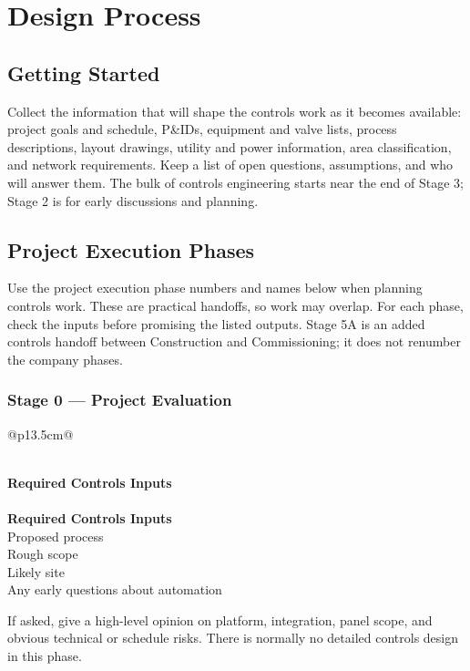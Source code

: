 \chapter{Design Process}
\section{Getting Started}
Collect the information that will shape the controls work as it becomes available: project goals and schedule, P\&IDs, equipment and valve lists, process descriptions, layout drawings, utility and power information, area classification, and network requirements. Keep a list of open questions, assumptions, and who will answer them. The bulk of controls engineering starts near the end of Stage 3; Stage 2 is for early discussions and planning.

\section{Project Execution Phases}
Use the project execution phase numbers and names below when planning controls work. These are practical handoffs, so work may overlap. For each phase, check the inputs before promising the listed outputs. Stage 5A is an added controls handoff between Construction and Commissioning; it does not renumber the company phases.

\subsection{Stage 0 --- Project Evaluation}

\begin{longtable}{@{}p{13.5cm}@{}}
\caption{Stage 0 --- Required Controls Inputs}\label{tab:stage0-inputs} \\
\toprule
{}\textbf{Required Controls Inputs} \\
\midrule
\endfirsthead
{} \\
\toprule
{}\textbf{Required Controls Inputs} \\
\midrule
\endhead
Proposed process \\
Rough scope \\
Likely site \\
Any early questions about automation \\
\bottomrule
\end{longtable}

If asked, give a high-level opinion on platform, integration, panel scope, and obvious technical or schedule risks. There is normally no detailed controls design in this phase.

